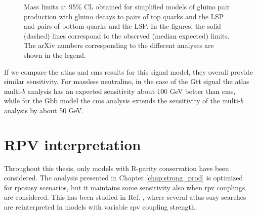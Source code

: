\begin{figure}[htbp]
	\centering 
	\caption{Mass limits at 95\% CL obtained for simplified models of gluino pair production 
	with gluino decays to  pairs of top quarks and the LSP and 
	pairs of bottom quarks and the LSP. 
	In the figures, the solid (dashed) 
	lines correspond to the observed (median expected) limits. The arXiv numbers corresponding to the different analyses are shown in the legend.
	}
	\label{fig:limits_GbbGtt_comp}
\end{figure}

If we compare the \gls{atlas} and \gls{cms} results for this signal model, 
they overall provide similar sensitivity. 
For massless neutralino, 
in the case of the Gtt signal the \gls{atlas} multi-$b$ analysis has an expected sensitivity about 100 GeV better than \gls{cms}, 
while for the Gbb model the \gls{cms} \htmiss analysis extends the sensitivity of the multi-$b$ analysis by about 50 GeV.

\FloatBarrier

\section{RPV interpretation}
\label{sec:rpvrpc}

Throughout this thesis, only models with R-parity conservation have been considered. 
The analysis presented in Chapter \ref{chap:strong_prod} is optimized for 
\gls{rpcsusy} scenarios, but it maintains some sensitivity also when \gls{rpv} couplings are considered. 
This has been studied in Ref. \cite{ATLAS-CONF-2018-003}, where several \gls{atlas} \gls{susy} searches  
are reinterpreted in models with variable \gls{rpv} coupling strength.


